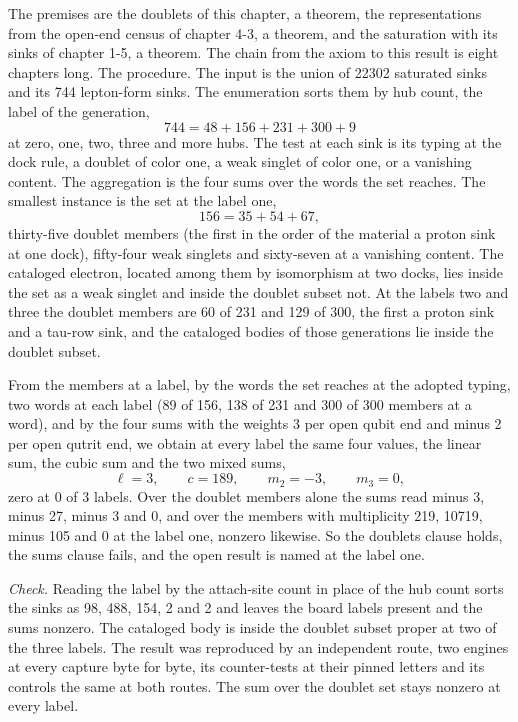 \begin{chproof}
The premises are the doublets of this chapter, a theorem, the representations from the open-end census of chapter 4-3, a theorem, and the saturation with its sinks of chapter 1-5, a theorem. The chain from the axiom to this result is eight chapters long. The procedure. The input is the union of 22302 saturated sinks and its 744 lepton-form sinks. The enumeration sorts them by hub count, the label of the generation,
\begin{equation}
744 = 48 + 156 + 231 + 300 + 9
\end{equation}
at zero, one, two, three and more hubs. The test at each sink is its typing at the dock rule, a doublet of color one, a weak singlet of color one, or a vanishing content. The aggregation is the four sums over the words the set reaches. The smallest instance is the set at the label one,
\begin{equation}
156 = 35 + 54 + 67 ,
\end{equation}
thirty-five doublet members (the first in the order of the material a proton sink at one dock), fifty-four weak singlets and sixty-seven at a vanishing content. The cataloged electron, located among them by isomorphism at two docks, lies inside the set as a weak singlet and inside the doublet subset not. At the labels two and three the doublet members are 60 of 231 and 129 of 300, the first a proton sink and a tau-row sink, and the cataloged bodies of those generations lie inside the doublet subset.

From the members at a label, by the words the set reaches at the adopted typing, two words at each label (89 of 156, 138 of 231 and 300 of 300 members at a word), and by the four sums with the weights 3 per open qubit end and minus 2 per open qutrit end, we obtain at every label the same four values, the linear sum, the cubic sum and the two mixed sums,
\begin{equation}
\ell = 3, \qquad c = 189, \qquad m_{2} = -3, \qquad m_{3} = 0 ,
\end{equation}
zero at 0 of 3 labels. Over the doublet members alone the sums read minus 3, minus 27, minus 3 and 0, and over the members with multiplicity 219, 10719, minus 105 and 0 at the label one, nonzero likewise. So the doublets clause holds, the sums clause fails, and the open result is named at the label one.

\emph{Check.} Reading the label by the attach-site count in place of the hub count sorts the sinks as 98, 488, 154, 2 and 2 and leaves the board labels present and the sums nonzero. The cataloged body is inside the doublet subset proper at two of the three labels. The result was reproduced by an independent route, two engines at every capture byte for byte, its counter-tests at their pinned letters and its controls the same at both routes.
The sum over the doublet set stays nonzero at every label.
\end{chproof}
\label{chend:VI-3-D538842-w-dbcl}
\par\medskip{}\label{narr:close:6-3}\par
